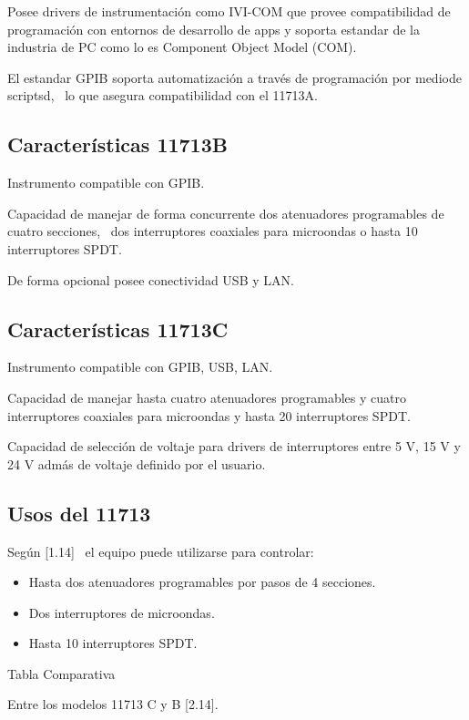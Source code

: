 Posee drivers de instrumentación como IVI-COM que provee compatibilidad de programación con entornos de desarrollo de
apps y soporta estandar de la industria de PC como lo es Component Object Model (COM).

El estandar GPIB soporta automatización a través de programación por mediode scriptsd, \ lo que asegura compatibilidad
con el 11713A.

\subsection{Características 11713B}
Instrumento compatible con GPIB.

Capacidad de manejar de forma concurrente dos atenuadores programables de cuatro secciones, \ dos interruptores
coaxiales para microondas o hasta 10 interruptores SPDT.

De forma opcional posee conectividad USB y LAN.

\subsection[Características 11713C]{Características 11713C}
Instrumento compatible con GPIB, USB, LAN.

Capacidad de manejar hasta cuatro atenuadores programables y cuatro interruptores coaxiales para microondas y hasta 20
interruptores SPDT.

Capacidad de selección de voltaje para drivers de interruptores entre 5 V, 15 V y 24 V admás de voltaje definido por el
usuario. 

\subsection{Usos del 11713}
Según [1.14] \ el equipo puede utilizarse para controlar:

\begin{itemize}
	\item Hasta dos atenuadores programables por pasos de 4 secciones.
	\item Dos interruptores de microondas.
	\item Hasta 10 interruptores SPDT.
\end{itemize}

Tabla Comparativa

Entre los modelos 11713 C y B [2.14].		

\begin{figure}
	\centering
	
\end{figure}

